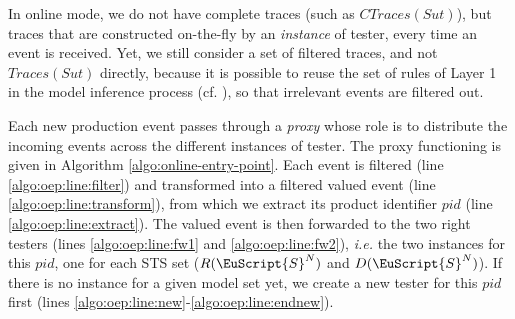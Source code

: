 In online mode, we do not have complete traces (such as
$CTraces({Sut})$), but traces that are constructed on-the-fly by
an \emph{instance} of tester, every time an event is received.
Yet, we still consider a set of filtered traces, and not
$Traces(Sut)$ directly, because it is possible to reuse the set
of rules of Layer 1 in the model inference process (cf.
), so that
irrelevant events are filtered out.

Each new production event passes through a \emph{proxy}
whose role is to distribute the incoming events across the
different instances of tester. The proxy functioning is
given in Algorithm \ref{algo:online-entry-point}. Each event is
filtered (line \ref{algo:oep:line:filter}) and transformed into a
filtered valued event (line \ref{algo:oep:line:transform}), from
which we extract its product identifier $pid$ (line
\ref{algo:oep:line:extract}).  The valued event is then forwarded
to the two right testers (lines \ref{algo:oep:line:fw1} and
\ref{algo:oep:line:fw2}), \emph{i.e.} the two instances for this
$pid$, one for each STS set ($R(\EuScript{S}^N)$ and
$D(\EuScript{S}^N)$).  If there is no instance for a given
model set yet, we create a new tester for this $pid$ first (lines
\ref{algo:oep:line:new}-\ref{algo:oep:line:endnew}).

